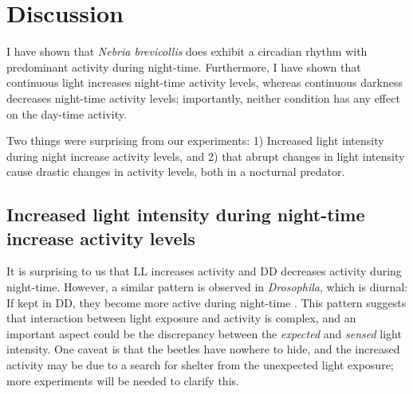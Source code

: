 \section{Discussion} \label{discussion}
I have shown that \textit{Nebria brevicollis} does exhibit a circadian rhythm with predominant activity during night-time. Furthermore, I have shown that continuous light increases night-time activity levels, whereas continuous darkness decreases night-time activity levels; importantly, neither condition has any effect on the day-time activity.

Two things were surprising from our experiments: 1) Increased light intensity during night increase activity levels, and 2) that abrupt changes in light intensity cause drastic changes in activity levels, both in a nocturnal predator. 

\subsection{Increased light intensity during night-time increase activity levels} \label{light}
It is surprising to us that LL increases activity and DD decreases activity during night-time. However, a similar pattern is observed in \textit{Drosophila}, which is diurnal: If kept in DD, they become more active during  night-time \citep{Xu2021a}. This pattern suggests that interaction between light exposure and activity is complex, and an important aspect could be the discrepancy between the \textit{expected} and \textit{sensed} light intensity. One caveat is that the beetles have nowhere to hide, and the increased activity may be due to a search for shelter from the unexpected light exposure; more experiments will be needed to clarify this.

